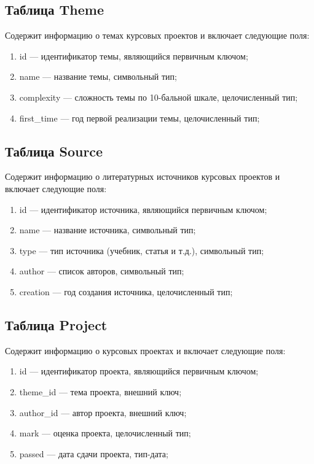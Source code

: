 \subsection*{Таблица Theme}

Содержит информацию о темах курсовых проектов и включает следующие поля:

\begin{enumerate}
	\item id --- идентификатор темы, являющийся первичным ключом;
	\item name --- название темы, символьный тип;
	\item complexity --- сложность темы по 10-бальной шкале, целочисленный тип;
	\item first\_time --- год первой реализации темы, целочисленный тип;
\end{enumerate}

\subsection*{Таблица Source}

Содержит информацию о литературных источников курсовых проектов и включает следующие поля:

\begin{enumerate}
	\item id --- идентификатор источника, являющийся первичным ключом;
	\item name --- название источника, символьный тип;
	\item type --- тип источника (учебник, статья и т.д.), символьный тип;
	\item author --- список авторов, символьный тип;
	\item creation --- год создания источника, целочисленный тип;
\end{enumerate}

\subsection*{Таблица Project}

Содержит информацию о курсовых проектах и включает следующие поля:

\begin{enumerate}
	\item id --- идентификатор проекта, являющийся первичным ключом;
	\item theme\_id --- тема проекта, внешний ключ;
	\item author\_id --- автор проекта, внешний ключ;
	\item mark --- оценка проекта, целочисленный тип;
	\item passed --- дата сдачи проекта, тип-дата;
\end{enumerate}


